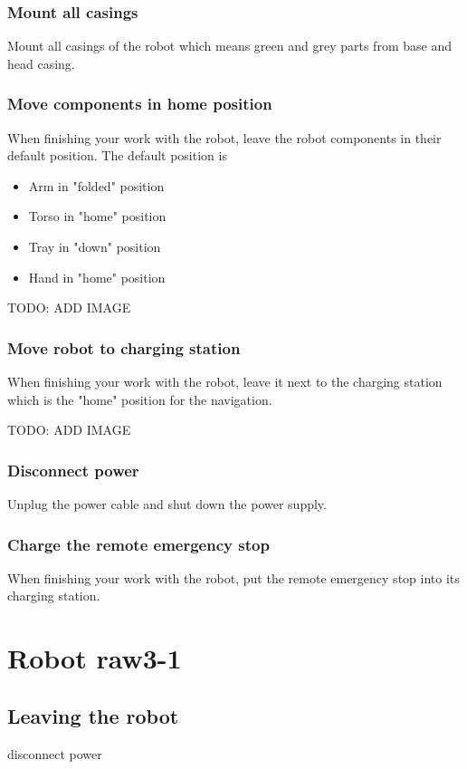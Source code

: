 \subsubsection{Mount all casings}
Mount all casings of the robot which means green and grey parts from base and head casing.

\subsubsection{Move components in home position}
When finishing your work with the robot, leave the robot components in their default position. The default position is
\begin{itemize}
\item Arm in "folded" position
\item Torso in "home" position
\item Tray in "down" position
\item Hand in "home" position
\end{itemize}

TODO: ADD IMAGE

\subsubsection{Move robot to charging station}
When finishing your work with the robot, leave it next to the charging station which is the "home" position for the navigation.

TODO: ADD IMAGE

\subsubsection{Disconnect power}
Unplug the power cable and shut down the power supply.

\subsubsection{Charge the remote emergency stop}
When finishing your work with the robot, put the remote emergency stop into its charging station.

\section{Robot raw3-1}

\subsection{Leaving the robot}

disconnect power